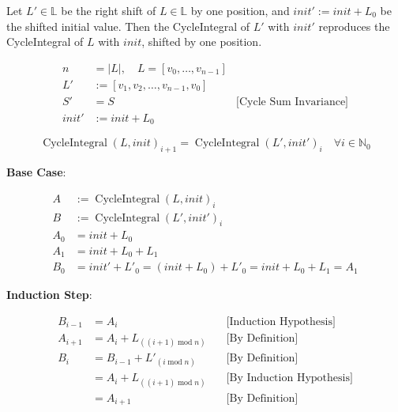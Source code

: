 Let $L' \in \mathbb{L}$ be the right shift of $L \in \mathbb{L}$ by one
position, and $init' := init + L_0$ be the shifted initial value. Then the
CycleIntegral of $L'$ with $init'$ reproduces the CycleIntegral of $L$ with
$init$, shifted by one position.

\begin{equation*}
\begin{aligned}
n &= |L|, \quad L = [v_0, \dots, v_{n-1}] \\
L' &:= [v_1, v_2, \dots, v_{n-1}, v_0] \\
S' &= S \quad &\text{[Cycle Sum Invariance]} \\
init' &:= init + L_0
\end{aligned}
\end{equation*}

\begin{equation*}
\operatorname{CycleIntegral}(L, init)_{i+1} = \operatorname{CycleIntegral}(L', init')_{i} \quad \forall i \in \mathbb{N}_0
\end{equation*}

\textbf{Base Case}:

\begin{equation*}
\begin{aligned}
A &:= \operatorname{CycleIntegral}(L, init)_i \\
B &:= \operatorname{CycleIntegral}(L', init')_{i} \\
A_0 &= init + L_0 \\
A_1 &= init + L_0 + L_1 \\
B_0 &= init' + L'_0 = (init + L_0) + L'_0 = init + L_0 + L_1 = A_1
\end{aligned}
\end{equation*}

\textbf{Induction Step}:

\begin{equation*}
\begin{aligned}
B_{i-1} &= A_i \quad &\text{[Induction Hypothesis]} \\
A_{i+1} &= A_i + L_{((i + 1) \operatorname{mod} n)} \quad &\text{[By Definition]} \\
B_i &= B_{i-1} + L'_{(i \operatorname{mod} n)} \quad &\text{[By Definition]} \\
    &= A_i + L_{((i + 1) \operatorname{mod} n)} \quad &\text{[By Induction Hypothesis]} \\
    &= A_{i+1} \quad &\text{[By Definition]}
\end{aligned}
\end{equation*}

